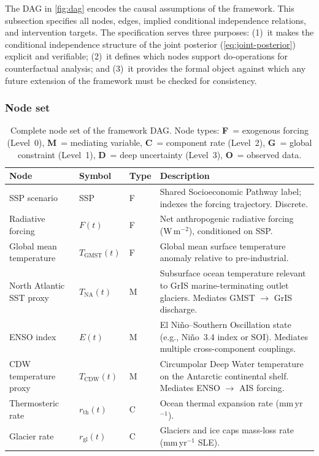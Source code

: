 \documentclass[11pt]{article}
\newcommand{\GMST}{\text{GMST}}
\newcommand{\CDW}{\text{CDW}}
\begin{document}
The DAG in \cref{fig:dag} encodes the causal assumptions of the framework.  This subsection specifies all nodes, edges, implied conditional independence relations, and intervention targets.  The specification serves three purposes: (1)~it makes the conditional independence structure of the joint posterior (\cref{eq:joint-posterior}) explicit and verifiable; (2)~it defines which nodes support do-operations for counterfactual analysis; and (3)~it provides the formal object against which any future extension of the framework must be checked for consistency.

\subsubsection{Node set}

\begin{table}[ht]
\centering
\caption{Complete node set of the framework DAG.  Node types: \textbf{F}~= exogenous forcing (Level~0), \textbf{M}~= mediating variable, \textbf{C}~= component rate (Level~2), \textbf{G}~= global constraint (Level~1), \textbf{D}~= deep uncertainty (Level~3), \textbf{O}~= observed data.}
\label{tab:dag-nodes}
\small
\begin{tabular}{lllp{7cm}}
\toprule
Node & Symbol & Type & Description \\
\midrule
SSP scenario & SSP & F & Shared Socioeconomic Pathway label; indexes the forcing trajectory.  Discrete. \\
Radiative forcing & $F(t)$ & F & Net anthropogenic radiative forcing (W\,m$^{-2}$), conditioned on SSP. \\
Global mean temperature & $T_{\GMST}(t)$ & F & Global mean surface temperature anomaly relative to pre-industrial. \\
\addlinespace
North Atlantic SST proxy & $T_{\text{NA}}(t)$ & M & Subsurface ocean temperature relevant to GrIS marine-terminating outlet glaciers.  Mediates GMST $\to$ GrIS discharge. \\
ENSO index & $E(t)$ & M & El Ni\~no--Southern Oscillation state (e.g., Ni\~no~3.4 index or SOI).  Mediates multiple cross-component couplings. \\
CDW temperature proxy & $T_{\CDW}(t)$ & M & Circumpolar Deep Water temperature on the Antarctic continental shelf.  Mediates ENSO $\to$ AIS forcing. \\
\addlinespace
Thermosteric rate & $r_{\text{th}}(t)$ & C & Ocean thermal expansion rate (mm\,yr$^{-1}$). \\
Glacier rate & $r_{\text{gl}}(t)$ & C & Glaciers and ice caps mass-loss rate (mm\,yr$^{-1}$ SLE). \\

\end{tabular}
\end{table}
\end{document}
